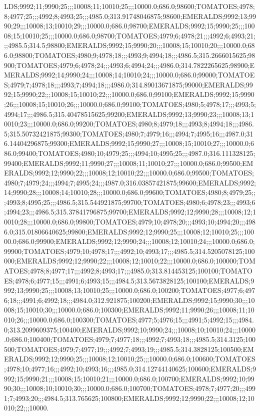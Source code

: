 LDS;9992;11;9990;25;;;10008;11;10010;25;;;10000.0;686.0;98600;TOMATOES;4978;8;4977;25;;;4992;8;4993;25;;;4985.0;313.91748046875;98600;EMERALDS;9992;13;9990;29;;;10008;13;10010;29;;;10000.0;686.0;98700;EMERALDS;9992;15;9990;25;;;10008;15;10010;25;;;10000.0;686.0;98700;TOMATOES;4979;6;4978;21;;;4992;6;4993;21;;;4985.5;314.5;98800;EMERALDS;9992;15;9990;20;;;10008;15;10010;20;;;10000.0;686.0;98800;TOMATOES;4980;9;4978;18;;;4993;9;4994;18;;;4986.5;315.2666015625;98900;TOMATOES;4979;6;4978;24;;;4993;6;4994;24;;;4986.0;314.7822265625;98900;EMERALDS;9992;14;9990;24;;;10008;14;10010;24;;;10000.0;686.0;99000;TOMATOES;4979;7;4978;18;;;4993;7;4994;18;;;4986.0;314.89013671875;99000;EMERALDS;9992;15;9990;22;;;10008;15;10010;22;;;10000.0;686.0;99100;EMERALDS;9992;15;9990;26;;;10008;15;10010;26;;;10000.0;686.0;99100;TOMATOES;4980;5;4978;17;;;4993;5;4994;17;;;4986.5;315.40478515625;99200;EMERALDS;9992;13;9990;23;;;10008;13;10010;23;;;10000.0;686.0;99200;TOMATOES;4980;8;4979;18;;;4993;8;4994;18;;;4986.5;315.50732421875;99300;TOMATOES;4980;7;4979;16;;;4994;7;4995;16;;;4987.0;316.14404296875;99300;EMERALDS;9992;15;9990;27;;;10008;15;10010;27;;;10000.0;686.0;99400;TOMATOES;4980;10;4979;25;;;4994;10;4995;25;;;4987.0;316.111328125;99400;EMERALDS;9992;11;9990;27;;;10008;11;10010;27;;;10000.0;686.0;99500;EMERALDS;9992;12;9990;22;;;10008;12;10010;22;;;10000.0;686.0;99500;TOMATOES;4980;7;4979;24;;;4994;7;4995;24;;;4987.0;316.03857421875;99600;EMERALDS;9992;14;9990;28;;;10008;14;10010;28;;;10000.0;686.0;99600;TOMATOES;4980;8;4979;25;;;4993;8;4995;25;;;4986.5;315.544921875;99700;TOMATOES;4980;6;4978;23;;;4993;6;4994;23;;;4986.5;315.37841796875;99700;EMERALDS;9992;12;9990;28;;;10008;12;10010;28;;;10000.0;686.0;99800;TOMATOES;4979;10;4978;20;;;4993;10;4994;20;;;4986.0;315.01806640625;99800;EMERALDS;9992;12;9990;25;;;10008;12;10010;25;;;10000.0;686.0;99900;EMERALDS;9992;12;9990;24;;;10008;12;10010;24;;;10000.0;686.0;99900;TOMATOES;4979;10;4978;17;;;4992;10;4993;17;;;4985.5;314.5205078125;100000;EMERALDS;9992;12;9990;22;;;10008;12;10010;22;;;10000.0;686.0;100000;TOMATOES;4978;8;4977;17;;;4992;8;4993;17;;;4985.0;313.814453125;100100;TOMATOES;4978;6;4977;15;;;4991;6;4993;15;;;4984.5;313.5673828125;100100;EMERALDS;9992;13;9990;25;;;10008;13;10010;25;;;10000.0;686.0;100200;TOMATOES;4977;6;4976;18;;;4991;6;4992;18;;;4984.0;312.921875;100200;EMERALDS;9992;15;9990;30;;;10008;15;10010;30;;;10000.0;686.0;100300;EMERALDS;9992;11;9990;26;;;10008;11;10010;26;;;10000.0;686.0;100300;TOMATOES;4977;5;4976;15;;;4991;5;4992;15;;;4984.0;313.2099609375;100400;EMERALDS;9992;10;9990;24;;;10008;10;10010;24;;;10000.0;686.0;100400;TOMATOES;4979;7;4977;18;;;4992;7;4993;18;;;4985.5;314.3125;100500;TOMATOES;4979;7;4977;19;;;4992;7;4993;19;;;4985.5;314.3828125;100500;EMERALDS;9992;12;9990;25;;;10008;12;10010;25;;;10000.0;686.0;100600;TOMATOES;4978;10;4977;16;;;4992;10;4993;16;;;4985.0;314.12744140625;100600;EMERALDS;9992;15;9990;21;;;10008;15;10010;21;;;10000.0;686.0;100700;EMERALDS;9992;10;9990;30;;;10008;10;10010;30;;;10000.0;686.0;100700;TOMATOES;4978;7;4977;20;;;4991;7;4993;20;;;4984.5;313.765625;100800;EMERALDS;9992;12;9990;22;;;10008;12;10010;22;;;10000.